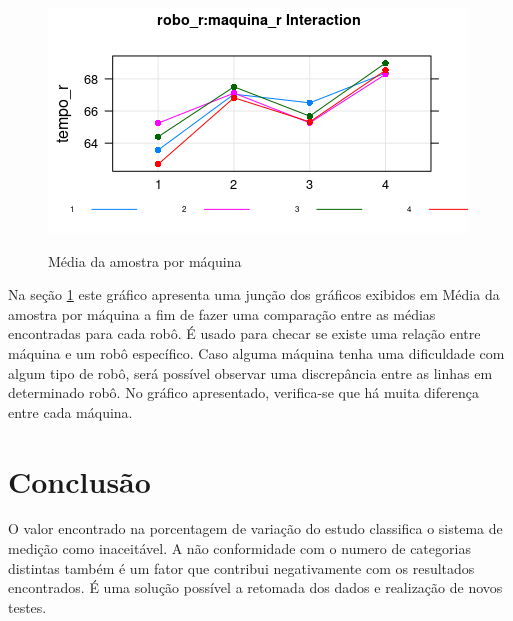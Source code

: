 \documentclass[
12pt,					%
openright,				%
oneside,				%
a4paper,				%
english,
brazil
]{ABNT/abntex2_report}
\begin{document}
\begin{figure}[H]
	\centering
	\caption{Média da amostra por máquina}
	\includegraphics[scale = 1]{figures/graf6.png}
	\label{fig:graf6}
\end{figure}

Na seção \ref{fig:graf6} este gráfico apresenta uma junção dos gráficos exibidos em Média da amostra por máquina a fim de fazer uma comparação entre as médias encontradas para cada robô. É usado para checar se existe uma relação entre máquina e um robô específico. Caso alguma máquina tenha uma dificuldade com algum tipo de robô, será possível observar uma discrepância entre as linhas em determinado robô. No gráfico apresentado, verifica-se que há muita diferença entre cada máquina.

\section*{Conclusão}
O valor encontrado na porcentagem de variação do estudo classifica o sistema de medição como inaceitável. A não conformidade com o numero de categorias distintas também é um fator que contribui negativamente com os resultados encontrados. É uma solução possível a retomada dos dados e realização de novos testes.





	\cleardoublepage
	\titleformat{\chapter}[display]{\vspace*{-24pt}\ABNTEXchapterfont\large\bfseries}{\chaptertitlename\ \thechapter}{12pt}{\Large}
	
\end{document}
